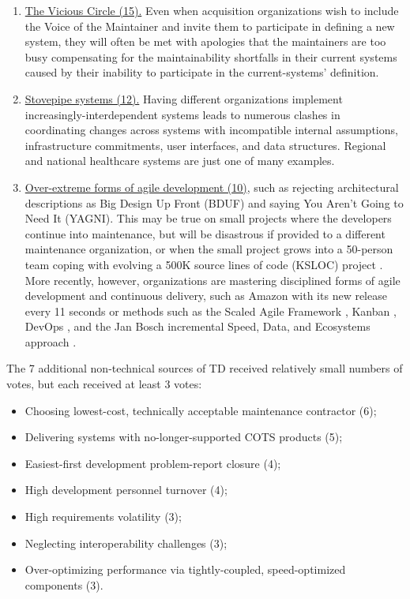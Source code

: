 \begin{enumerate}
	\item \ul{The Vicious Circle (15).}
	Even when acquisition organizations wish to include the Voice of the Maintainer and invite them to participate in defining a new system, they will often be met with apologies that the maintainers are too busy compensating for the maintainability shortfalls in their current systems caused by their inability to participate in the current-systems' definition.
	\item \ul{Stovepipe systems (12).}
	Having different organizations implement increasingly-interdependent systems leads to numerous clashes in coordinating changes across systems with incompatible internal assumptions, infrastructure commitments, user interfaces, and data structures.
	Regional and national healthcare systems are just one of many examples.
	\item \ul{ Over-extreme forms of agile development (10)}, such as rejecting architectural descriptions as Big Design Up Front (BDUF) and saying You Aren't Going to Need It (YAGNI).
	This may be true on small projects where the developers continue into maintenance, but will be disastrous if provided to a different maintenance organization, or when the small project grows into a 50-person team coping with evolving a 500K source lines of code (KSLOC) project \cite{1008006}.
	More recently, however, organizations are mastering disciplined forms of agile development and continuous delivery, such as Amazon with its new release every 11 seconds or methods such as the Scaled Agile Framework \cite{leffingwell2007scaling}, Kanban \cite{anderson2010kanban}, DevOps \cite{davis2016effective}, and the Jan Bosch incremental Speed, Data, and Ecosystems approach \cite{bosch2017speed}.
\end{enumerate}

The 7 additional non-technical sources of TD received relatively small numbers of votes, but each received at least 3 votes:
\begin{itemize}
	\item Choosing lowest-cost, technically acceptable maintenance contractor (6);
	\item Delivering systems with no-longer-supported COTS products (5);
	\item Easiest-first development problem-report closure (4);
	\item High development personnel turnover (4);
	\item High requirements volatility (3);
	\item Neglecting interoperability challenges (3);
	\item Over-optimizing performance via tightly-coupled, speed-optimized components (3).
\end{itemize}

